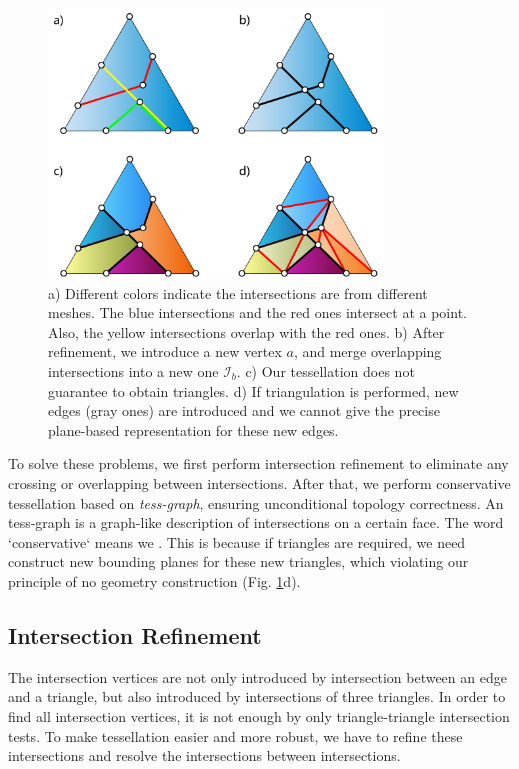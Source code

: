 \documentclass[10pt,journal,compsoc]{IEEEtran}
\begin{document}
\begin{figure}[t]
\centering
\includegraphics[width=3.5in]{boolean-04}
\caption{a) Different colors indicate the intersections are from different meshes. The blue intersections and the red ones intersect at a point. Also, the yellow intersections overlap with the red ones. b) After refinement, we introduce a new vertex $a$, and merge overlapping intersections into a new one $\mathcal{I}_b$. c) Our tessellation does not guarantee to obtain triangles. d) If triangulation is performed, new edges (gray ones) are introduced and we cannot give the precise plane-based representation for these new edges.}
\label{fig:iisect}
\end{figure}

To solve these problems, we first perform intersection refinement to eliminate any crossing or overlapping between intersections. After that, we perform conservative tessellation based on \emph{tess-graph}, ensuring unconditional topology correctness. An tess-graph is a graph-like description of intersections on a certain face. The word `conservative` means we . This is because if triangles are required, we need construct new bounding planes for these new triangles, which violating our principle of no geometry construction (Fig. \ref{fig:iisect}d).

\subsection{Intersection Refinement}


The intersection vertices are not only introduced by intersection between an edge and a triangle, but also introduced by intersections of three triangles. In order to find all intersection vertices, it is not enough by only triangle-triangle intersection tests. To make tessellation easier and more robust, we have to refine these intersections and resolve the intersections between intersections.
\end{document}
